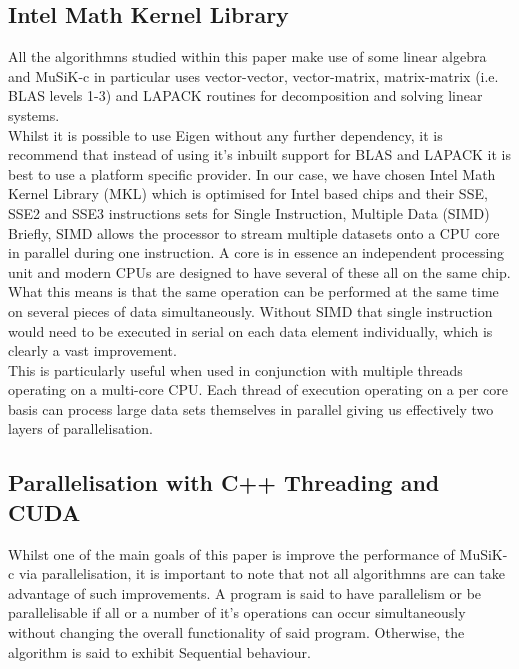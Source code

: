 \documentclass[a4paper]{amsart}
\begin{document}
\subsection{Intel Math Kernel Library}
All the algorithmns studied within this paper make use of some linear algebra and MuSiK-c in particular uses vector-vector, vector-matrix, matrix-matrix (i.e. BLAS levels 1-3) and LAPACK routines for decomposition and solving linear systems.\\

Whilst it is possible to use Eigen without any further dependency, it is recommend that instead of using it's inbuilt support for BLAS and LAPACK it is best to use a platform specific provider. In our case, we have chosen Intel Math Kernel Library\cite{mkl1} (MKL) which is optimised for Intel based chips\cite{mkl2} and their SSE\cite{mkl4}, SSE2 and SSE3 instructions sets for Single Instruction, Multiple Data\cite{mkl3} (SIMD)\\

Briefly, SIMD allows the processor to stream multiple datasets onto a CPU core in parallel during one instruction. A core is in essence an independent processing unit and modern CPUs are designed to have several of these all on the same chip. What this means is that the same operation can be performed at the same time on several pieces of data simultaneously. Without SIMD that single instruction would need to be executed in serial on each data element individually, which is clearly a vast improvement.\\

This is particularly useful when used in conjunction with multiple threads operating on a multi-core CPU. Each thread of execution operating on a per core basis can process large data sets themselves in parallel giving us effectively two layers of parallelisation.



\subsection{Parallelisation with C++ Threading and CUDA}

Whilst one of the main goals of this paper is improve the performance of MuSiK-c via parallelisation, it is important to note that not all algorithmns are can take advantage of such improvements. A program is said to have parallelism or be parallelisable if all or a number of it's operations can occur simultaneously without changing the overall functionality of said program. Otherwise, the algorithm is said to exhibit Sequential behaviour.
\end{document}
